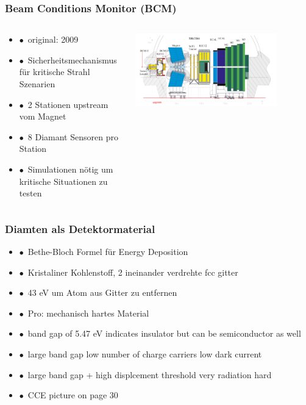 \documentclass[aspectratio=1610, 12pt, xcolor=dvipsnames]{beamer}
\begin{document}
\begin{frame}\frametitle{Beam Conditions Monitor (BCM)}
  \begin{columns}
    \begin{column}[c]{0.48\textwidth}
      \begin{itemize}
        \item $\bullet$\, original: 2009 
        \item $\bullet$\, Sicherheitsmechanismus für kritische Strahl Szenarien
        \item $\bullet$\, 2 Stationen upstream vom Magnet
        \item $\bullet$\, 8 Diamant Sensoren pro Station
        \item $\bullet$\, Simulationen nötig um kritische Situationen zu testen
      \end{itemize}
    \end{column}
    \begin{column}[c]{0.48\textwidth}
      \includegraphics[width=0.8\textwidth]{plots/bcm_full.png}
    \end{column}
  \end{columns}
\end{frame}

\begin{frame}\frametitle{Diamten als Detektormaterial}
  \begin{itemize}
    \item $\bullet$\, Bethe-Bloch Formel für Energy Deposition
    \item $\bullet$\, Kristaliner Kohlenstoff, 2 ineinander verdrehte fcc gitter
    \item $\bullet$\, 43 eV um Atom aus Gitter zu entfernen
    \item $\bullet$\, Pro: mechanisch hartes Material
    \item $\bullet$\, band gap of 5.47 eV indicates insulator but can be semiconductor as well
    \item $\bullet$\, large band gap \to low number of charge carriers \to low dark current
    \item $\bullet$\, large band gap + high displcement threshold \to very radiation hard
    \item $\bullet$\, CCE picture on page 30
  \end{itemize}
\end{frame}
\end{document}
